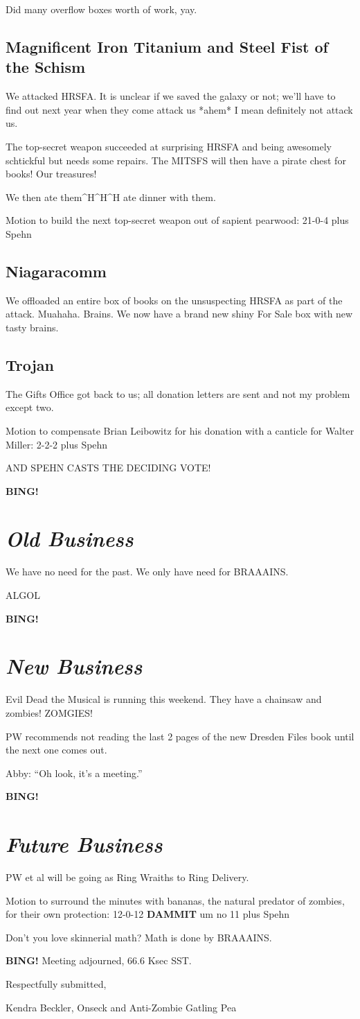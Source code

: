 \documentclass[10pt]{article}
\newcommand{\bing}{{\bf BING!} }
\newcommand{\goto}[1]{\bing \vskip 12pt \section*{{\em{#1}}}}
\newcommand{\ps}{ plus Spehn\xspace}
\newcommand{\onseck}{Kendra Beckler, Onseck and Anti-Zombie Gatling Pea}
\begin{document}
Did many overflow boxes worth of work, yay.

\subsection*{Magnificent Iron Titanium and Steel Fist of the Schism}

We attacked HRSFA.  It is unclear if we saved the galaxy or not; we'll have to find out next year when they come attack us *ahem* I mean definitely not attack us.

The top-secret weapon succeeded at surprising HRSFA and being awesomely schtickful but needs some repairs.  The MITSFS will then have a pirate chest for books!  Our treasures!

We then ate them^H^H^H ate dinner with them.

Motion to build the next top-secret weapon out of sapient pearwood: 21-0-4 \ps

\subsection*{Niagaracomm}

We offloaded an entire box of books on the unsuspecting HRSFA as part of the attack.  Muahaha.  Brains.  We now have a brand new shiny For Sale box with new tasty brains.

\subsection*{Trojan}

The Gifts Office got back to us; all donation letters are sent and not my problem except two.

Motion to compensate Brian Leibowitz for his donation with a canticle for Walter Miller: 2-2-2 \ps

AND SPEHN CASTS THE DECIDING VOTE!

\goto{Old Business}

We have no need for the past.  We only have need for BRAAAINS.

ALGOL

\goto{New Business}

Evil Dead the Musical is running this weekend.  They have a chainsaw and zombies!  ZOMGIES!

PW recommends not reading the last 2 pages of the new Dresden Files book until the next one comes out.

Abby: ``Oh look, it's a meeting.''

\goto{Future Business}

PW et al will be going as Ring Wraiths to Ring Delivery.

Motion to surround the minutes with bananas, the natural predator of zombies, for their own protection: 12-0-12 \textbf{DAMMIT} um no 11 \ps

Don't you love skinnerial math?  Math is done by BRAAAINS.

\bing
\noindent
Meeting adjourned, 66.6 Ksec SST.

\vspace{18pt}

\centerline{Respectfully submitted,}
\centerline{\onseck}
\end{document}

